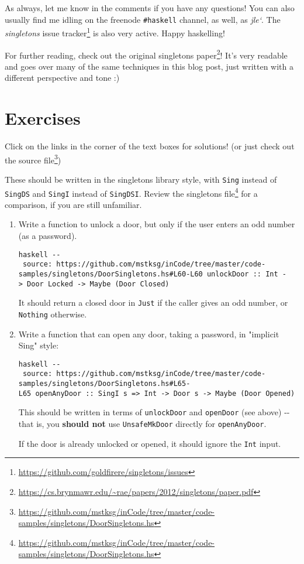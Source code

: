 \documentclass[]{article}
\renewcommand{\href}[2]{#2\footnote{\url{#1}}}
\begin{document}
As always, let me know in the comments if you have any questions! You can also
usually find me idling on the freenode \texttt{\#haskell} channel, as well, as
\emph{jle`}. The \emph{singletons}
\href{https://github.com/goldfirere/singletons/issues}{issue tracker} is also
very active. Happy haskelling!

For further reading, check out the
\href{https://cs.brynmawr.edu/~rae/papers/2012/singletons/paper.pdf}{original
singletons paper}! It's very readable and goes over many of the same techniques
in this blog post, just written with a different perspective and tone :)

\section{Exercises}

Click on the links in the corner of the text boxes for solutions! (or just check
out
\href{https://github.com/mstksg/inCode/tree/master/code-samples/singletons/DoorSingletons.hs}{the
source file})

These should be written in the singletons library style, with \texttt{Sing}
instead of \texttt{SingDS} and \texttt{SingI} instead of \texttt{SingDSI}.
Review the
\href{https://github.com/mstksg/inCode/tree/master/code-samples/singletons/DoorSingletons.hs}{singletons
file} for a comparison, if you are still unfamiliar.

\begin{enumerate}
\item
  Write a function to unlock a door, but only if the user enters an odd number
  (as a password).

  \texttt{haskell\ -\/-\ source:\ https://github.com/mstksg/inCode/tree/master/code-samples/singletons/DoorSingletons.hs\#L60-L60\ unlockDoor\ ::\ Int\ -\textgreater{}\ Door\ \textquotesingle{}Locked\ -\textgreater{}\ Maybe\ (Door\ \textquotesingle{}Closed)}

  It should return a closed door in \texttt{Just} if the caller gives an odd
  number, or \texttt{Nothing} otherwise.
\item
  Write a function that can open any door, taking a password, in "implicit Sing"
  style:

  \texttt{haskell\ -\/-\ source:\ https://github.com/mstksg/inCode/tree/master/code-samples/singletons/DoorSingletons.hs\#L65-L65\ openAnyDoor\ ::\ SingI\ s\ =\textgreater{}\ Int\ -\textgreater{}\ Door\ s\ -\textgreater{}\ Maybe\ (Door\ \textquotesingle{}Opened)}

  This should be written in terms of \texttt{unlockDoor} and \texttt{openDoor}
  (see above) -\/- that is, you \textbf{should not} use \texttt{UnsafeMkDoor}
  directly for \texttt{openAnyDoor}.

  If the door is already unlocked or opened, it should ignore the \texttt{Int}
  input.
\end{enumerate}
\end{document}
